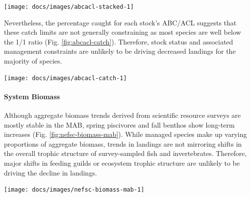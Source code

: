 \documentclass[
  10pt,
]{article}
\let\origfigure\figure
\let\endorigfigure\endfigure
\renewenvironment{figure}[1][2] {
    \expandafter\origfigure\expandafter[H]
} {
    \endorigfigure
}
\begin{document}
\begin{figure}

{\centering \texttt{[image: docs/images/abcacl-stacked-1]} 

}

\caption{Sum of catch limits across all MAFMC managed fisheries.}\label{fig:abcacl-stacked}
\end{figure}

Nevertheless, the percentage caught for each stock's ABC/ACL suggests
that these catch limits are not generally constraining as most species
are well below the 1/1 ratio (Fig. \ref{fig:abcacl-catch}). Therefore,
stock status and associated management constraints are unlikely to be
driving decreased landings for the majority of species.

\begin{figure}

{\centering \texttt{[image: docs/images/abcacl-catch-1]} 

}

\caption{Catch divided by ABC/ACL for MAFMC managed fisheies. Chub mackerel removed due extremely low catch. Outliers = Recreational Black Sea Bass.}\label{fig:abcacl-catch}
\end{figure}

\hypertarget{system-biomass}{%
\paragraph{System Biomass}\label{system-biomass}}

Although aggregate biomass trends derived from scientific resource
surveys are mostly stable in the MAB, spring piscivores and fall benthos
show long-term increases (Fig. \ref{fig:nefsc-biomass-mab}). While
managed species make up varying proportions of aggregate biomass, trends
in landings are not mirroring shifts in the overall trophic structure of
survey-sampled fish and invertebrates. Therefore, major shifts in
feeding guilds or ecosystem trophic structure are unlikely to be driving
the decline in landings.

\begin{figure}

{\centering \texttt{[image: docs/images/nefsc-biomass-mab-1]} 

}

\caption{Spring (left) and fall (right) surveyed biomass in the Mid-Atlantic Bight. Data from the NEFSC Bottom Trawl Survey are shown in black, with NEAMAP shown in red. The shaded area around each annual mean represents 2 standard deviations from the mean.}\label{fig:nefsc-biomass-mab}
\end{figure}
\end{document}
